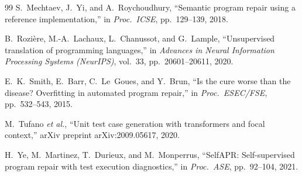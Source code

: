 \begin{thebibliography}{99}
S.~Mechtaev, J.~Yi, and A.~Roychoudhury,
``Semantic program repair using a reference implementation,''
in \textit{Proc.\ ICSE}, pp.~129--139, 2018.

B.~Rozière, M.-A.~Lachaux, L.~Chanussot, and G.~Lample,
``Unsupervised translation of programming languages,''
in \textit{Advances in Neural Information Processing Systems (NeurIPS)},
vol.~33, pp.~20601--20611, 2020.

E.~K.~Smith, E.~Barr, C.~Le~Goues, and Y.~Brun,
``Is the cure worse than the disease? Overfitting in automated program repair,''
in \textit{Proc.\ ESEC/FSE}, pp.~532--543, 2015.

M.~Tufano \textit{et al.},
``Unit test case generation with transformers and focal context,''
arXiv preprint arXiv:2009.05617, 2020.

H.~Ye, M.~Martinez, T.~Durieux, and M.~Monperrus,
``SelfAPR: Self-supervised program repair with test execution diagnostics,''
in \textit{Proc.\ ASE}, pp.~92--104, 2021.

\end{thebibliography}

